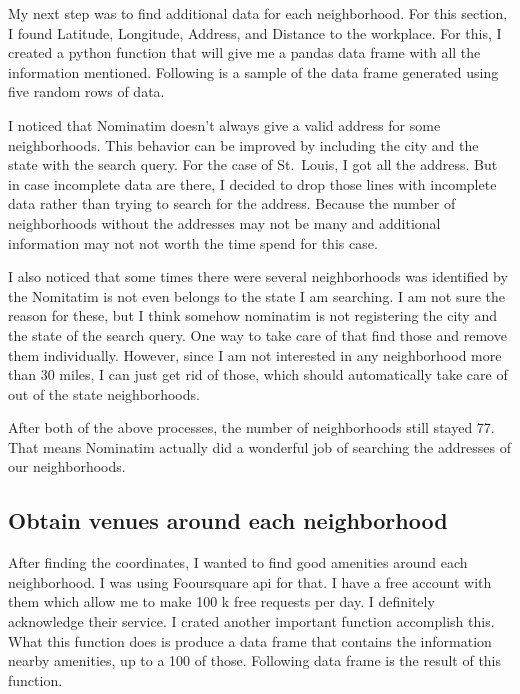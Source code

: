 \documentclass[11pt]{article}
\begin{document}
My next step was to find additional data for each neighborhood. For this section, I found Latitude, Longitude, Address, and Distance to the workplace. For this, I created a python function that will give me a pandas data frame with all the information mentioned. Following is a sample of the data frame generated using five random rows of data.

	
    \begin{center}
    \end{center}

           
    I noticed that Nominatim doesn't always give a valid address for some
neighborhoods. This behavior can be improved by including the city and
the state with the search query. For the case of St.~Louis, I got all
the address. But in case incomplete data are there, I decided to drop
those lines with incomplete data rather than trying to search for the
address. Because the number of neighborhoods without the addresses may
not be many and additional information may not not worth the time spend
for this case.

    I also noticed that some times there were several neighborhoods was
identified by the Nomitatim is not even belongs to the state I am
searching. I am not sure the reason for these, but I think somehow
nominatim is not registering the city and the state of the search query.
One way to take care of that find those and remove them individually.
However, since I am not interested in any neighborhood more than 30
miles, I can just get rid of those, which should automatically take care
of out of the state neighborhoods.

      After both of the above processes, the number of neighborhoods still stayed 77.
That means Nominatim actually did a wonderful job of searching the
addresses of our neighborhoods. 

             
    \hypertarget{obtain-venues-around-each-neighborhood}{%
\subsection{Obtain venues around each
neighborhood}\label{obtain-venues-around-each-neighborhood}}

 	After finding the coordinates, I wanted to find good amenities around each neighborhood. I was using Fooursquare api for that. I have a free account with them which
allow me to make 100 k free requests per day. I definitely acknowledge
their service. I crated another important function accomplish this. What this function does is produce a data frame that contains the information nearby amenities, up to a 100 of those. Following data frame is the result of this function.
\end{document}
